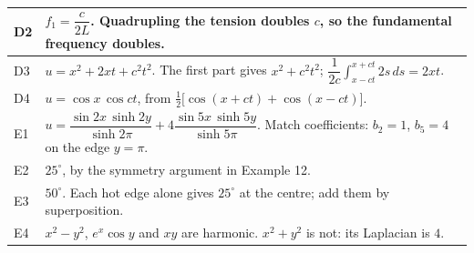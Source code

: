 \documentclass[11pt]{article}
\begin{document}
\begin{longtable}{|p{1.4cm}|p{14cm}|}
\hline
D2 & $f_1=\dfrac{c}{2L}$. Quadrupling the tension doubles $c$, so the fundamental frequency \textbf{doubles}.\\
\hline
D3 & $u=x^2+2xt+c^2t^2$. The first part gives $x^2+c^2t^2$; $\dfrac1{2c}\int_{x-ct}^{x+ct}2s\,ds=2xt$.\\
\hline
D4 & $u=\cos x\,\cos ct$, from $\tfrac12\big[\cos(x+ct)+\cos(x-ct)\big]$.\\
\hline
E1 & $u=\dfrac{\sin2x\,\sinh2y}{\sinh2\pi}+4\dfrac{\sin5x\,\sinh5y}{\sinh5\pi}$. Match coefficients: $b_2=1$, $b_5=4$ on the edge $y=\pi$.\\
\hline
E2 & $25^\circ$, by the symmetry argument in Example 12.\\
\hline
E3 & $50^\circ$. Each hot edge alone gives $25^\circ$ at the centre; add them by superposition.\\
\hline
E4 & $x^2-y^2$, $e^x\cos y$ and $xy$ are harmonic. $x^2+y^2$ is not: its Laplacian is $4$.\\
\hline
\end{longtable}
\end{document}
